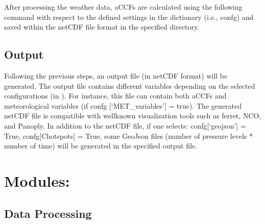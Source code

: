\documentclass[a4paper,11pt,english]{sphinxmanual}
\begin{document}
After processing the weather data, aCCFs are calculated using the following command with respect to the defined settings in the dictionary (i.e., confg) and saved within the netCDF file format in the specified directory.

\begin{sphinxVerbatim}[commandchars=\\\{\}]
\end{sphinxVerbatim}


\section{Output}
\label{\detokenize{gStarted:output}}
Following the previous steps, an output file (in netCDF format) will be generated. The output file contains different variables depending on the selected configurations (in ).
For instance, this file can contain both aCCFs and meteorological variables (if confg {[}‘MET\_variables’{]} = true). The generated netCDF file is compatible with well\sphinxhyphen{}known visualization tools such as ferret, NCO, and Panoply.
In addition to the netCDF file, if one selects: confg{[}‘geojson’{]} = True, confg{[}Chotspots{]} = True, some GeoJson files (number of pressure levels * number of time) will be generated in the specified output file.


\chapter{Modules:}
\label{\detokenize{index:modules}}

\section{Data Processing}
\label{\detokenize{modules:module-envlib.extract_data}}\label{\detokenize{modules:data-processing}}\label{\detokenize{modules::doc}}
\end{document}
